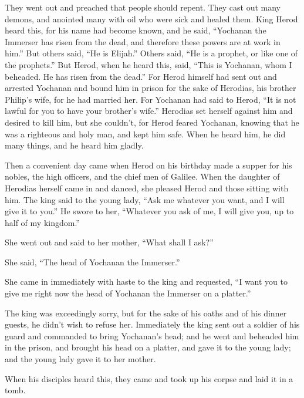 \myverse{}They went out and preached that people should repent.
\myverse{}They cast out many demons, and anointed many with oil who were sick and healed
them.
\myverse{}King Herod heard this, for his name had become known, and he said, “Yochanan the Immerser
has risen from the dead, and therefore these powers are at work in him.”
\myverse{}But others said, “He is Elijah.” Others said, “He is a prophet, or like one
of the prophets.”
\myverse{}But Herod, when he heard this, said, “This is Yochanan, whom I beheaded. He
has risen from the dead.”
\myverse{}For Herod himself had sent out and arrested Yochanan and bound him in prison
for the sake of Herodias, his brother Philip’s wife, for he had married her.
\myverse{}For Yochanan had said to Herod, “It is not lawful for you to have your brother’s
wife.”
\myverse{}Herodias set herself against him and desired to kill him, but she couldn’t,
\myverse{}for Herod feared Yochanan, knowing that he was a righteous and holy man, and
kept him safe. When he heard him, he did many things, and he heard him gladly.

\myverse{}Then a convenient day came when Herod on his birthday made a
supper for his nobles, the high officers, and the chief men of Galilee.
\myverse{}When the daughter of Herodias herself came in and danced, she pleased Herod
and those sitting with him. The king said to the young lady, “Ask me whatever you want, and I will give
it to you.”
\myverse{}He swore to her, “Whatever you ask of me, I will give you, up to half of my
kingdom.”

\myverse{}She went out and said to her mother, “What shall I ask?”

She said, “The head of Yochanan the Immerser.”

\myverse{}She came in immediately with haste to the king and requested,
“I want you to give me right now the head of Yochanan the Immerser on a platter.”

\myverse{}The king was exceedingly sorry, but for the sake of his oaths
and of his dinner guests, he didn’t wish to refuse her.
\myverse{}Immediately the king sent out a soldier of his guard and commanded to bring
Yochanan’s head; and he went and beheaded him in the prison,
\myverse{}and brought his head on a platter, and gave it to the young lady; and the
young lady gave it to her mother.

\myverse{}When his disciples heard this, they came and took up his corpse
and laid it in a tomb.

